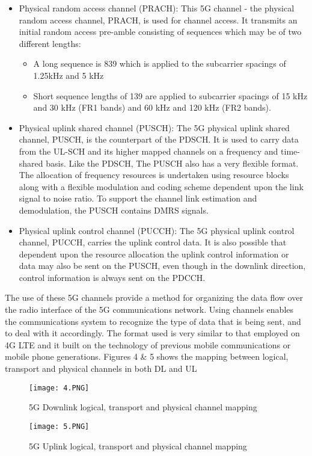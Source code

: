 \begin{itemize}
    \item Physical random access channel (PRACH): This 5G channel - the physical random access channel, PRACH, is used for channel access. It transmits an initial random access pre-amble consisting of sequences which may be of two different lengths:

    \begin{itemize}
        \item A long sequence is 839 which is applied to the subcarrier spacings of 1.25kHz and 5 kHz
        \item Short sequence lengths of 139 are applied to subcarrier spacings of 15 kHz and 30 kHz (FR1 bands) and 60 kHz and 120 kHz (FR2 bands).
    \end{itemize}
    
    \item Physical uplink shared channel (PUSCH):   The 5G physical uplink shared channel, PUSCH, is the counterpart of the PDSCH. It is used to carry data from the UL-SCH and its higher mapped channels on a frequency and time-shared basis. 
    \newline
    Like the PDSCH, The PUSCH also has a very flexible format. The allocation of frequency resources is undertaken using resource blocks along with a flexible modulation and coding scheme dependent upon the link signal to noise ratio.
    \newline
    To support the channel link estimation and demodulation, the PUSCH contains DMRS signals.
    \item Physical uplink control channel (PUCCH):   The 5G physical uplink control channel, PUCCH, carries the uplink control data. It is also possible that dependent upon the resource allocation the uplink control information or data may also be sent on the PUSCH, even though in the downlink direction, control information is always sent on the PDCCH.
\end{itemize}
	
The use of these 5G channels provide a method for organizing the data flow over the radio interface of the 5G communications network. Using channels enables the communications system to recognize the type of data that is being sent, and to deal with it accordingly. The format used is very similar to that employed on 4G LTE and it built on the technology of previous mobile communications or mobile phone generations.
\newline\newline
Figures 4 \& 5 shows the mapping between logical, transport and physical channels in both DL and UL
\begin{figure}[h]
    \centering
    \texttt{[image: 4.PNG]}
    \caption{5G Downlink logical, transport and physical channel mapping}
    \label{fig:sub-first}
\end{figure}

\begin{figure}[h]
    \centering
    \texttt{[image: 5.PNG]}
    \caption{5G Uplink logical, transport and physical channel mapping}         \label{fig:second}
\end{figure}
